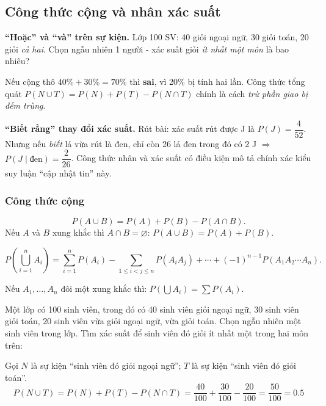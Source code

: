 \documentclass[12pt,a4paper]{article}
\begin{document}
\subsection{Công thức cộng và nhân xác suất}

\begin{dongco}
\textbf{``Hoặc'' và ``và'' trên sự kiện.} Lớp 100 SV: 40 giỏi ngoại ngữ, 30 giỏi toán, 20 giỏi \emph{cả hai}. Chọn ngẫu nhiên 1 người - xác suất giỏi \emph{ít nhất một môn} là bao nhiêu?

Nếu cộng thô $40\% + 30\% = 70\%$ thì \textbf{sai}, vì 20\% bị tính hai lần. Công thức tổng quát $P(N \cup T) = P(N) + P(T) - P(N \cap T)$ chính là cách \emph{trừ phần giao bị đếm trùng}.

\medskip
\textbf{``Biết rằng'' thay đổi xác suất.} Rút bài: xác suất rút được J là $P(J) = \dfrac{4}{52}$. Nhưng nếu \emph{biết} lá vừa rút là đen, chỉ còn 26 lá đen trong đó có 2 J $\Rightarrow$ $P(J \mid \text{đen}) = \dfrac{2}{26}$. Công thức nhân và xác suất có điều kiện mô tả chính xác kiểu suy luận ``cập nhật tin'' này.
\end{dongco}

\subsubsection{Công thức cộng}

\begin{dinhnghia}
\[
  P(A \cup B) = P(A) + P(B) - P(A \cap B).
\]
Nếu $A$ và $B$ xung khắc thì $A \cap B = \varnothing$: $P(A \cup B) = P(A) + P(B)$.

\[
  P(\bigcup_{i=1}^{n} A_i) = \displaystyle\sum_{i=1}^{n} P(A_i) - \displaystyle\sum_{1 \le i < j \le n} P(A_iA_j) + \cdots + (-1)^{n-1} P(A_1A_2 \cdots A_n).
\]

Nếu $A_1, \ldots, A_n$ đôi một xung khắc thì: $P(\bigcup A_i) = \displaystyle\sum P(A_i)$.
\end{dinhnghia}

\begin{vidu}[title={Lớp 100 sinh viên}]
Một lớp có 100 sinh viên, trong đó có 40 sinh viên giỏi ngoại ngữ, 30 sinh viên giỏi toán, 20 sinh viên vừa giỏi ngoại ngữ, vừa giỏi toán. Chọn ngẫu nhiên một sinh viên trong lớp. Tìm xác suất để sinh viên đó giỏi ít nhất một trong hai môn trên:

Gọi $N$ là sự kiện “sinh viên đó giỏi ngoại ngữ”; $T$ là sự kiện “sinh viên đó giỏi toán”.
\[
  P(N \cup T) = P(N) + P(T) - P(N \cap T) = \dfrac{40}{100} + \dfrac{30}{100} - \dfrac{20}{100} = \dfrac{50}{100} = 0.5
\]
\end{vidu}
\end{document}
